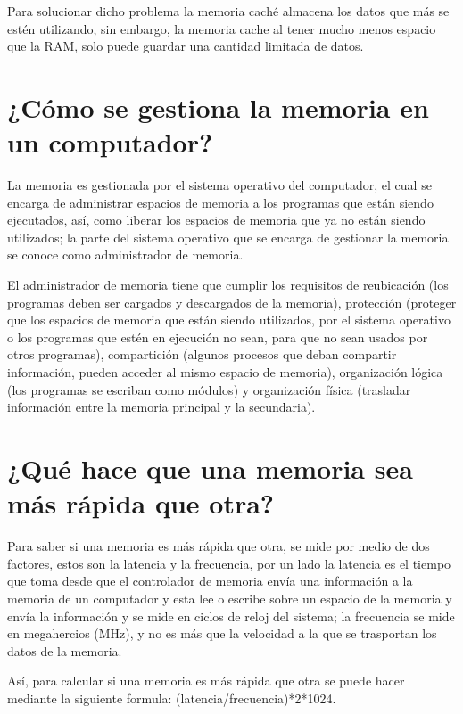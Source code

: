 \documentclass{article}
\begin{document}
Para solucionar dicho problema la memoria caché almacena los datos que más se estén utilizando, sin embargo, la memoria cache al tener mucho menos espacio que la RAM, solo puede guardar una cantidad limitada de datos.\cite{Salazar}

\section{¿Cómo se gestiona la memoria en un computador?}
La memoria es gestionada por el sistema operativo del computador, el cual se encarga de administrar espacios de memoria a los programas que están siendo ejecutados, así, como liberar los espacios de memoria que ya no están siendo utilizados; la parte del sistema operativo que se encarga de gestionar la memoria se conoce como administrador de memoria.
\vspace{0.5cm}

El administrador de memoria tiene que cumplir los requisitos de reubicación (los programas deben ser cargados y descargados de la memoria), protección (proteger que los espacios de memoria que están siendo utilizados, por el sistema operativo o los programas que estén en ejecución no sean, para que no sean usados por otros programas), compartición (algunos procesos que deban compartir información, pueden acceder al mismo espacio de memoria), organización lógica (los programas se escriban como módulos) y organización física (trasladar información entre la memoria principal y la secundaria).\cite{aguilera2015sistemas} 

\section{¿Qué hace que una memoria sea más rápida que otra?}
Para saber si una memoria es más rápida que otra, se mide por medio de dos factores, estos son la latencia y la frecuencia, por un lado la latencia es el tiempo que toma desde que el controlador de memoria envía una información  a la memoria de un computador y esta lee o escribe sobre un espacio de la memoria y envía la información y se mide en ciclos de reloj del sistema\cite{Salazar}; la frecuencia se mide en megahercios (MHz), y no es más que la velocidad a la que se trasportan los datos de la memoria.\cite{computerhoy}
\vspace{0.5cm}

Así, para calcular si una memoria es más rápida que otra se puede hacer mediante la siguiente formula: (latencia/frecuencia)*2*1024.\cite{computerhoy}



\end{document}
